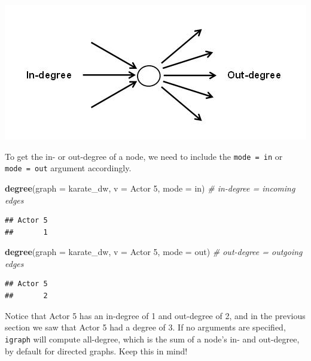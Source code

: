\documentclass[
]{book}
\newenvironment{Shaded}{\begin{snugshade}}{\end{snugshade}}
\newcommand{\AttributeTok}[1]{\textcolor[rgb]{0.13,0.29,0.53}{#1}}
\newcommand{\CommentTok}[1]{\textcolor[rgb]{0.56,0.35,0.01}{\textit{#1}}}
\newcommand{\FunctionTok}[1]{\textcolor[rgb]{0.13,0.29,0.53}{\textbf{#1}}}
\newcommand{\NormalTok}[1]{#1}
\newcommand{\StringTok}[1]{\textcolor[rgb]{0.31,0.60,0.02}{#1}}
\begin{document}
\includegraphics{images/in_out_degree.jpg}

To get the in- or out-degree of a node, we need to include the \texttt{mode\ =\ \textquotesingle{}in\textquotesingle{}} or \texttt{mode\ =\ \textquotesingle{}out\textquotesingle{}} argument accordingly.

\begin{Shaded}
\begin{Highlighting}[]
\FunctionTok{degree}\NormalTok{(}\AttributeTok{graph =}\NormalTok{ karate\_dw, }\AttributeTok{v =} \StringTok{\textquotesingle{}Actor 5\textquotesingle{}}\NormalTok{, }\AttributeTok{mode =} \StringTok{\textquotesingle{}in\textquotesingle{}}\NormalTok{) }\CommentTok{\# in{-}degree = incoming edges}
\end{Highlighting}
\end{Shaded}

\begin{verbatim}
## Actor 5 
##       1
\end{verbatim}

\begin{Shaded}
\begin{Highlighting}[]
\FunctionTok{degree}\NormalTok{(}\AttributeTok{graph =}\NormalTok{ karate\_dw, }\AttributeTok{v =} \StringTok{\textquotesingle{}Actor 5\textquotesingle{}}\NormalTok{, }\AttributeTok{mode =} \StringTok{\textquotesingle{}out\textquotesingle{}}\NormalTok{) }\CommentTok{\# out{-}degree = outgoing edges}
\end{Highlighting}
\end{Shaded}

\begin{verbatim}
## Actor 5 
##       2
\end{verbatim}

Notice that Actor 5 has an in-degree of 1 and out-degree of 2, and in the previous section we saw that Actor 5 had a degree of 3. If no arguments are specified, \texttt{igraph} will compute all-degree, which is the sum of a node's in- and out-degree, by default for directed graphs. Keep this in mind!
\end{document}
